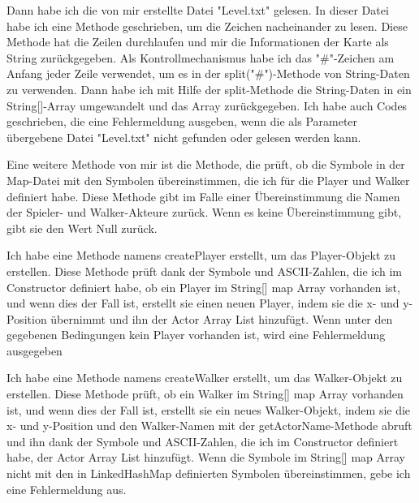 \documentclass{pi1}
\begin{document}


Dann habe ich die von mir erstellte Datei "Level.txt" gelesen. In dieser Datei habe ich eine Methode geschrieben, um die Zeichen nacheinander zu lesen. Diese Methode hat die Zeilen durchlaufen und mir die Informationen der Karte als String zurückgegeben. Als Kontrollmechanismus habe ich das "\#"-Zeichen am Anfang jeder Zeile verwendet, um es in der split("\#")-Methode von String-Daten zu verwenden. Dann habe ich mit Hilfe der split-Methode die String-Daten in ein String[]-Array umgewandelt und das Array zurückgegeben. Ich habe auch Codes geschrieben, die eine Fehlermeldung ausgeben, wenn die als Parameter übergebene Datei "Level.txt" nicht gefunden oder gelesen werden kann.






Eine weitere Methode von mir ist die Methode, die prüft, ob die Symbole in der Map-Datei mit den Symbolen übereinstimmen, die ich für die Player und Walker definiert habe. Diese Methode gibt im Falle einer Übereinstimmung die Namen der Spieler- und Walker-Akteure zurück. Wenn es keine Übereinstimmung gibt, gibt sie den Wert Null zurück.



Ich habe eine Methode namens createPlayer erstellt, um das Player-Objekt zu erstellen. Diese Methode prüft dank der Symbole und ASCII-Zahlen, die ich im Constructor definiert habe, ob ein Player im String[] map Array vorhanden ist, und wenn dies der Fall ist, erstellt sie einen neuen Player, indem sie die x- und y-Position übernimmt und ihn der Actor Array List hinzufügt. Wenn unter den gegebenen Bedingungen kein Player vorhanden ist, wird eine Fehlermeldung ausgegeben



Ich habe eine Methode namens createWalker erstellt, um das Walker-Objekt zu erstellen. Diese Methode prüft, ob ein Walker im String[] map Array vorhanden ist, und wenn dies der Fall ist, erstellt sie ein neues Walker-Objekt, indem sie die x- und y-Position und den Walker-Namen mit der getActorName-Methode abruft und ihn dank der Symbole und ASCII-Zahlen, die ich im Constructor definiert habe, der Actor Array List hinzufügt. Wenn die Symbole im String[] map Array nicht mit den in LinkedHashMap definierten Symbolen übereinstimmen, gebe ich eine Fehlermeldung aus.
\end{document}
